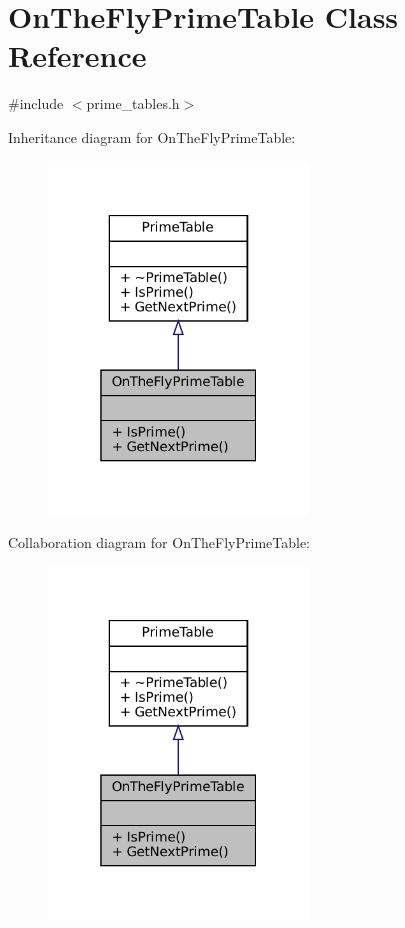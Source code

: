 \hypertarget{classOnTheFlyPrimeTable}{}\section{On\+The\+Fly\+Prime\+Table Class Reference}
\label{classOnTheFlyPrimeTable}


{\ttfamily \#include $<$prime\+\_\+tables.\+h$>$}



Inheritance diagram for On\+The\+Fly\+Prime\+Table\+:
\nopagebreak
\begin{figure}[H]
\begin{center}
\leavevmode
\includegraphics[width=196pt]{classOnTheFlyPrimeTable__inherit__graph}
\end{center}
\end{figure}


Collaboration diagram for On\+The\+Fly\+Prime\+Table\+:
\nopagebreak
\begin{figure}[H]
\begin{center}
\leavevmode
\includegraphics[width=196pt]{classOnTheFlyPrimeTable__coll__graph}
\end{center}
\end{figure}
